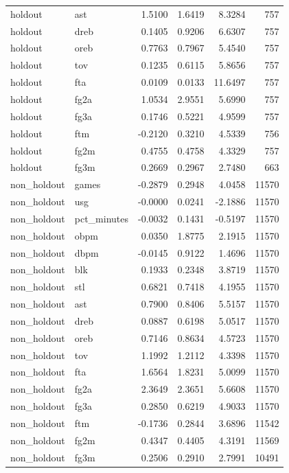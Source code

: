 \begin{table}
\begin{tabular}{llrrrr}
holdout & ast & 1.5100 & 1.6419 & 8.3284 & 757 \\
holdout & dreb & 0.1405 & 0.9206 & 6.6307 & 757 \\
holdout & oreb & 0.7763 & 0.7967 & 5.4540 & 757 \\
holdout & tov & 0.1235 & 0.6115 & 5.8656 & 757 \\
holdout & fta & 0.0109 & 0.0133 & 11.6497 & 757 \\
holdout & fg2a & 1.0534 & 2.9551 & 5.6990 & 757 \\
holdout & fg3a & 0.1746 & 0.5221 & 4.9599 & 757 \\
holdout & ftm & -0.2120 & 0.3210 & 4.5339 & 756 \\
holdout & fg2m & 0.4755 & 0.4758 & 4.3329 & 757 \\
holdout & fg3m & 0.2669 & 0.2967 & 2.7480 & 663 \\
non\_holdout & games & -0.2879 & 0.2948 & 4.0458 & 11570 \\
non\_holdout & usg & -0.0000 & 0.0241 & -2.1886 & 11570 \\
non\_holdout & pct\_minutes & -0.0032 & 0.1431 & -0.5197 & 11570 \\
non\_holdout & obpm & 0.0350 & 1.8775 & 2.1915 & 11570 \\
non\_holdout & dbpm & -0.0145 & 0.9122 & 1.4696 & 11570 \\
non\_holdout & blk & 0.1933 & 0.2348 & 3.8719 & 11570 \\
non\_holdout & stl & 0.6821 & 0.7418 & 4.1955 & 11570 \\
non\_holdout & ast & 0.7900 & 0.8406 & 5.5157 & 11570 \\
non\_holdout & dreb & 0.0887 & 0.6198 & 5.0517 & 11570 \\
non\_holdout & oreb & 0.7146 & 0.8634 & 4.5723 & 11570 \\
non\_holdout & tov & 1.1992 & 1.2112 & 4.3398 & 11570 \\
non\_holdout & fta & 1.6564 & 1.8231 & 5.0099 & 11570 \\
non\_holdout & fg2a & 2.3649 & 2.3651 & 5.6608 & 11570 \\
non\_holdout & fg3a & 0.2850 & 0.6219 & 4.9033 & 11570 \\
non\_holdout & ftm & -0.1736 & 0.2844 & 3.6896 & 11542 \\
non\_holdout & fg2m & 0.4347 & 0.4405 & 4.3191 & 11569 \\
non\_holdout & fg3m & 0.2506 & 0.2910 & 2.7991 & 10491 \\
\bottomrule
\end{tabular}
\end{table}
